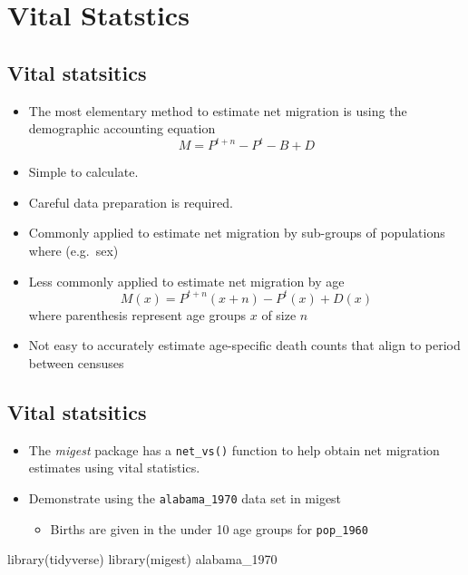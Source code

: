 \documentclass[
]{book}
\newenvironment{Shaded}{\begin{snugshade}}{\end{snugshade}}
\newcommand{\FunctionTok}[1]{\textcolor[rgb]{0.00,0.00,0.00}{#1}}
\newcommand{\NormalTok}[1]{#1}
\providecommand{\tightlist}{%
  \setlength{\itemsep}{0pt}\setlength{\parskip}{0pt}}
\begin{document}
\hypertarget{vital-statstics}{%
\section{Vital Statstics}\label{vital-statstics}}

\hypertarget{vital-statsitics}{%
\subsection{Vital statsitics}\label{vital-statsitics}}

\begin{itemize}
\tightlist
\item
  The most elementary method to estimate net migration is using the demographic accounting equation
  \[
  M = P^{t+n} - P^{t} - B + D
  \]
\item
  Simple to calculate.
\item
  Careful data preparation is required.
\item
  Commonly applied to estimate net migration by sub-groups of populations where (e.g.~sex)
\item
  Less commonly applied to estimate net migration by age
  \[
  M(x) = P^{t+n}(x+n) - P^{t}(x) + D(x)
  \] where parenthesis represent age groups \(x\) of size \(n\)
\item
  Not easy to accurately estimate age-specific death counts that align to period between censuses
\end{itemize}

\hypertarget{vital-statsitics-1}{%
\subsection{Vital statsitics}\label{vital-statsitics-1}}

\begin{itemize}
\tightlist
\item
  The \emph{migest} package has a \texttt{net\_vs()} function to help obtain net migration estimates using vital statistics.
\item
  Demonstrate using the \texttt{alabama\_1970} data set in migest

  \begin{itemize}
  \tightlist
  \item
    Births are given in the under 10 age groups for \texttt{pop\_1960}
  \end{itemize}
\end{itemize}

\begin{Shaded}
\begin{Highlighting}[]
\FunctionTok{library}\NormalTok{(tidyverse)}
\FunctionTok{library}\NormalTok{(migest)}
\NormalTok{alabama\_1970}
\end{Highlighting}
\end{Shaded}
\end{document}
